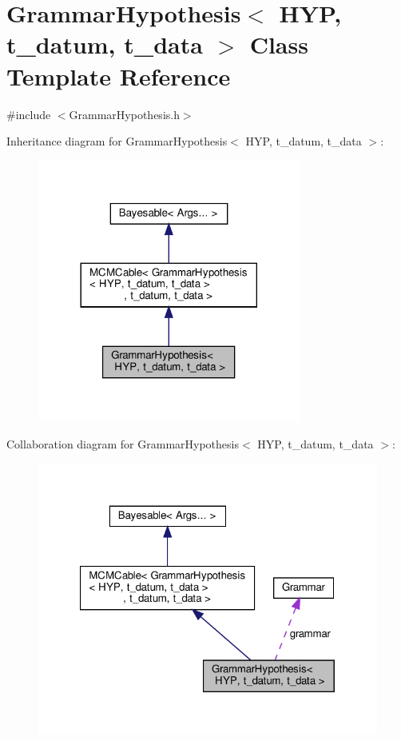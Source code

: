 \hypertarget{class_grammar_hypothesis}{}\section{Grammar\+Hypothesis$<$ H\+YP, t\+\_\+datum, t\+\_\+data $>$ Class Template Reference}
\label{class_grammar_hypothesis}


{\ttfamily \#include $<$Grammar\+Hypothesis.\+h$>$}



Inheritance diagram for Grammar\+Hypothesis$<$ H\+YP, t\+\_\+datum, t\+\_\+data $>$\+:\nopagebreak
\begin{figure}[H]
\begin{center}
\leavevmode
\includegraphics[width=245pt]{class_grammar_hypothesis__inherit__graph}
\end{center}
\end{figure}


Collaboration diagram for Grammar\+Hypothesis$<$ H\+YP, t\+\_\+datum, t\+\_\+data $>$\+:\nopagebreak
\begin{figure}[H]
\begin{center}
\leavevmode
\includegraphics[width=321pt]{class_grammar_hypothesis__coll__graph}
\end{center}
\end{figure}
